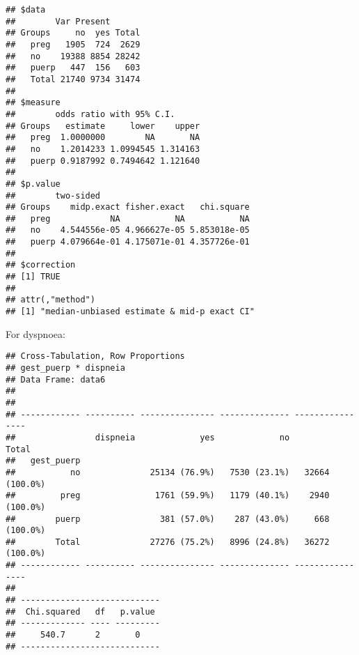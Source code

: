 \documentclass[
]{article}
\newenvironment{Shaded}{\begin{snugshade}}{\end{snugshade}}
\newcommand{\DataTypeTok}[1]{\textcolor[rgb]{0.13,0.29,0.53}{#1}}
\newcommand{\KeywordTok}[1]{\textcolor[rgb]{0.13,0.29,0.53}{\textbf{#1}}}
\newcommand{\NormalTok}[1]{#1}
\newcommand{\OperatorTok}[1]{\textcolor[rgb]{0.81,0.36,0.00}{\textbf{#1}}}
\newcommand{\OtherTok}[1]{\textcolor[rgb]{0.56,0.35,0.01}{#1}}
\newcommand{\StringTok}[1]{\textcolor[rgb]{0.31,0.60,0.02}{#1}}
\begin{document}
\begin{verbatim}
## $data
##        Var Present
## Groups     no  yes Total
##   preg   1905  724  2629
##   no    19388 8854 28242
##   puerp   447  156   603
##   Total 21740 9734 31474
## 
## $measure
##        odds ratio with 95% C.I.
## Groups   estimate     lower    upper
##   preg  1.0000000        NA       NA
##   no    1.2014233 1.0994545 1.314163
##   puerp 0.9187992 0.7494642 1.121640
## 
## $p.value
##        two-sided
## Groups    midp.exact fisher.exact   chi.square
##   preg            NA           NA           NA
##   no    4.544556e-05 4.966627e-05 5.853018e-05
##   puerp 4.079664e-01 4.175071e-01 4.357726e-01
## 
## $correction
## [1] TRUE
## 
## attr(,"method")
## [1] "median-unbiased estimate & mid-p exact CI"
\end{verbatim}

For dyspnoea:

\begin{Shaded}
\end{Shaded}

\begin{verbatim}
## Cross-Tabulation, Row Proportions  
## gest_puerp * dispneia  
## Data Frame: data6  
## 
## 
## ------------ ---------- --------------- -------------- ----------------
##                dispneia             yes             no            Total
##   gest_puerp                                                           
##           no              25134 (76.9%)   7530 (23.1%)   32664 (100.0%)
##         preg               1761 (59.9%)   1179 (40.1%)    2940 (100.0%)
##        puerp                381 (57.0%)    287 (43.0%)     668 (100.0%)
##        Total              27276 (75.2%)   8996 (24.8%)   36272 (100.0%)
## ------------ ---------- --------------- -------------- ----------------
## 
## ----------------------------
##  Chi.squared   df   p.value 
## ------------- ---- ---------
##     540.7      2       0    
## ----------------------------
\end{verbatim}

\begin{Shaded}
\end{Shaded}
\end{document}
